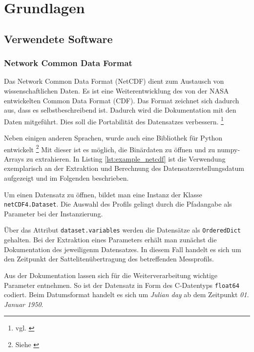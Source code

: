 \section{Grundlagen}
    \subsection{Verwendete Software}
    \subsubsection{Network Common Data Format}
    
    Das Network Common Data Format (NetCDF) dient zum Austausch von wissenschaftlichen Daten. Es ist eine Weiterentwicklung des von der NASA entwickelten Common Data Format (CDF). Das Format zeichnet sich dadurch aus, dass es selbstbeschreibend ist. Dadurch wird die Dokumentation mit den Daten mitgeführt. Dies soll die Portabilität des Datensatzes verbessern.  \footnote{vgl. \cite{FisherNetCDF}}
   
    Neben einigen anderen Sprachen, wurde auch eine Bibliothek für Python entwickelt \footnote{Siehe \cite{netCDF4}} Mit dieser ist es möglich, die Binärdaten zu öffnen und zu numpy-Arrays zu extrahieren. In Listing \ref{lst:example_netcdf} ist die Verwendung exemplarisch an der Extraktion und Berechnung des Datensatzerstellungsdatum aufgezeigt und im Folgenden beschrieben.
    
    
    Um einen Datensatz zu öffnen, bildet man eine Instanz der Klasse \texttt{netCDF4.Dataset}. Die Auswahl des Profils gelingt durch die Pfadangabe als Parameter bei der Instanzierung.
    
    Über das Attribut \texttt{dataset.variables} werden die Datensätze als \texttt{OrderedDict} gehalten. Bei der Extraktion eines Parameters erhält man zunächst die Dokumentation des jeweiligenm Datensatzes. In diesem Fall handelt es sich um den Zeitpunkt der Sattelitenübertragung des betreffenden Messprofils.
    
    Aus der Dokumentation lassen sich für die Weiterverarbeitung wichtige Parameter entnehmen.
    So ist der Datensatz in Form des C-Datentyps \texttt{float64} codiert. Beim Datumsformat handelt es sich um \textit{Julian day} ab dem Zeitpunkt \textit{01. Januar 1950}.
    
